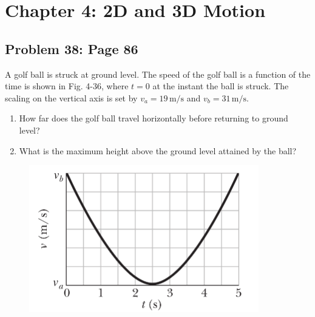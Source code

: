 \documentclass{article}
\begin{document}
\newpage

\section{Chapter 4: 2D and 3D Motion}

    \subsection{Problem 38: Page 86}
    A golf ball is struck at ground level. The speed of the golf 
    ball is a function of the time is shown in Fig. 4-36, where 
    $t=0$ at the instant the ball is struck. The scaling on the vertical 
    axis is set by $v_a=19\,\mathrm{m/s}$ and $v_b=31\,\mathrm{m/s}$.
    \begin{enumerate}[label=(\alph*)]
        \item How far does the golf ball travel 
        horizontally before returning to ground level?
        \item What is the maximum height above the ground 
        level attained by the ball?
    \end{enumerate}
    \begin{figure}[h!]
        \centering    
        \includegraphics[width=10cm]{Exam1Practice_Figures/motion.png}
    \end{figure}
\end{document}
